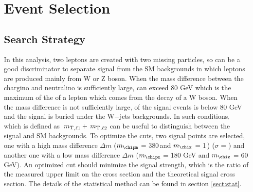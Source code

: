\section{Event Selection}
\label{sect:cuts}
\subsection{Search Strategy}
In this analysis, two leptons are created with two missing particles, so \mttwo can be a good discriminator to separate signal 
from the SM backgrounds in which leptons are produced mainly from W or Z boson. When the mass difference between the chargino and neutralino 
is sufficiently large, \mttwo can exceed 80 GeV which is the maximum of the \mt of a lepton which comes from the decay of a W boson.
When the mass difference is not sufficiently large, \mttwo of the signal events is below 80 GeV and the signal is buried under the W+jets
backgrounds. In such conditions, \SumMT which is defined as $\,{m_{\rm T}}_{,\ell1} + \,{m_{\rm T}}_{,\ell2}$ can be useful to distinguish between the signal and 
SM backgrounds.
To optimize the cuts, two signal points are selected, one with a high mass difference 
$\Delta m$ ($m_{\chipm}$ = 380\,\GeV and $m_{\chiz}$ = 1\,\GeV) ($\sigma$ = ) and another one with a low mass difference 
$\Delta m$ ($m_{\chipm}$ = 180 GeV and $m_{\chiz}$ = 60 GeV). %
An optimized cut should minimize the signal strength, 
which is the ratio of the measured upper limit on the cross section and the theoretical signal cross section. The details of the statistical 
method can be found in section \ref{sect:stat}.

